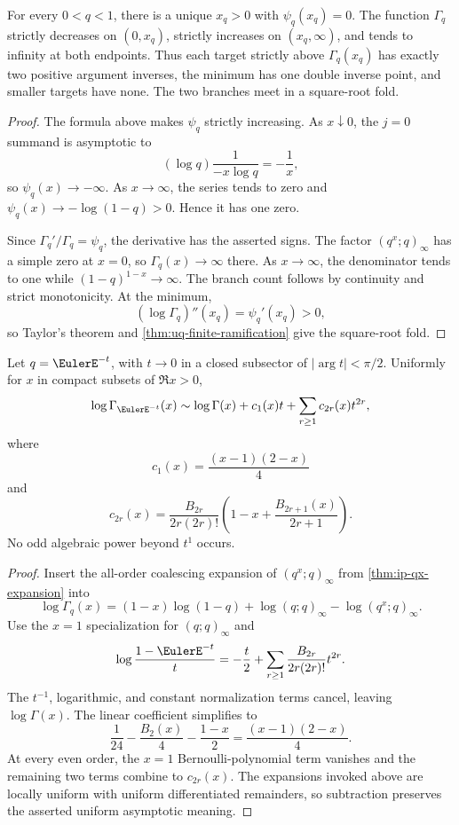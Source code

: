 \begin{theorem}
\label{thm:qs-qgamma-minimum}
For every \(0<q<1\), there is a unique \(x_q>0\) with
\(\psi_q(x_q)=0\).  The function \(\Gamma_q\) strictly decreases on
\((0,x_q)\), strictly increases on \((x_q,\infty)\), and tends to infinity
at both endpoints.  Thus each target strictly above
\(\Gamma_q(x_q)\) has exactly two positive argument inverses, the minimum has
one double inverse point, and smaller targets have none.  The two branches
meet in a square-root fold.
\end{theorem}

\begin{proof}
The formula above makes \(\psi_q\) strictly increasing.  As \(x\downarrow0\),
the \(j=0\) summand is asymptotic to
\[
  (\log q)\frac1{-x\log q}=-\frac1x,
\]
so \(\psi_q(x)\to-\infty\).  As \(x\to\infty\), the series tends to zero and
\(\psi_q(x)\to-\log(1-q)>0\).  Hence it has one zero.

Since \(\Gamma_q'/\Gamma_q=\psi_q\), the derivative has the asserted signs.
The factor \((q^x;q)_\infty\) has a simple zero at \(x=0\), so
\(\Gamma_q(x)\to\infty\) there.  As \(x\to\infty\), the denominator tends to
one while \((1-q)^{1-x}\to\infty\).  The branch count follows by continuity
and strict monotonicity.  At the minimum,
\[
  (\log\Gamma_q)''(x_q)=\psi_q'(x_q)>0,
\]
so Taylor's theorem and \cref{thm:uq-finite-ramification} give the
square-root fold.
\end{proof}

\begin{theorem}
\label{thm:qs-qgamma-one}
Let \(q=\EulerE^{-t}\), with \(t\to0\) in a closed subsector of
\(|\arg t|<\pi/2\).  Uniformly for \(x\) in compact subsets of
\(\Re x>0\),
\[
  \log\Gamma_{\EulerE^{-t}}(x)
  \sim\log\Gamma(x)+c_1(x)t+\sum_{r\ge1}c_{2r}(x)t^{2r},
\]
where
\[
  c_1(x)=\frac{(x-1)(2-x)}4
\]
and
\[
  c_{2r}(x)
  =\frac{B_{2r}}{2r(2r)!}
   \left(1-x+\frac{B_{2r+1}(x)}{2r+1}\right).
\]
No odd algebraic power beyond \(t^1\) occurs.
\end{theorem}

\begin{proof}
Insert the all-order coalescing expansion of
\((q^x;q)_\infty\) from \cref{thm:ip-qx-expansion} into
\[
  \log\Gamma_q(x)
  =(1-x)\log(1-q)+\log(q;q)_\infty-\log(q^x;q)_\infty.
\]
Use the \(x=1\) specialization for \((q;q)_\infty\) and
\[
  \log\frac{1-\EulerE^{-t}}{t}
  =-\frac t2+\sum_{r\ge1}
   \frac{B_{2r}}{2r(2r)!}t^{2r}.
\]
The \(t^{-1}\), logarithmic, and constant normalization terms cancel,
leaving \(\log\Gamma(x)\).  The linear coefficient simplifies to
\[
  \frac1{24}-\frac{B_2(x)}4-\frac{1-x}{2}
  =\frac{(x-1)(2-x)}4.
\]
At every even order, the \(x=1\) Bernoulli-polynomial term vanishes and the
remaining two terms combine to \(c_{2r}(x)\).  The expansions invoked above
are locally uniform with uniform differentiated remainders, so subtraction
preserves the asserted uniform asymptotic meaning.
\end{proof}

